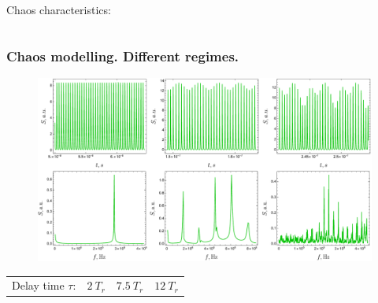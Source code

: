 \begin{frame}
\begin{columns}
\begin{column}{.6\linewidth}
			Chaos characteristics:
			\begin{itemize}
			\end{itemize}
		\end{column}
	\end{columns}
	
\end{frame}

\begin{frame}
	\frametitle{Chaos modelling. Different regimes.}
	
	\begin{figure}
		\centering
		\includegraphics[width=\linewidth]{figures/chaos_and_spectra.pdf}
	\end{figure}
	
	\begin{center}
		\begin{tabular}{c|c|c}
			Delay time $\tau$:\ \ $2 \ T_r$ & $7.5 \ T_r$ & $12 \ T_r$
		\end{tabular}
	\end{center}
	
	
	
\end{frame}

